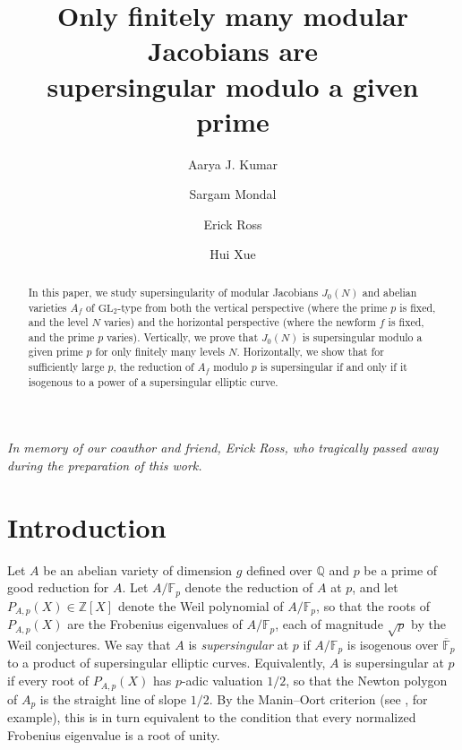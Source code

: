 \documentclass[11pt,letterpaper,reqno]{amsart}
\title{Only finitely many modular Jacobians are \\ supersingular modulo a given prime}
\author[A. J. Kumar]{Aarya J. Kumar}
\author[S. Mondal]{Sargam Mondal}
\author[E. Ross]{Erick Ross}
\author[H. Xue]{Hui Xue}
\theoremstyle{definition}
\numberwithin{equation}{section}
\numberwithin{figure}{section}
\numberwithin{table}{section}
\begin{document}
\begin{abstract}
In this paper, we study supersingularity of modular Jacobians $J_0(N)$ and abelian varieties $A_f$ of $\mathrm{GL}_{2}$-type from both the vertical perspective (where the prime $p$ is fixed, and the level $N$ varies) and the horizontal perspective (where the newform $f$ is fixed, and the prime $p$ varies). Vertically, we prove that $J_{0}(N)$ is supersingular modulo a given prime $p$ for only finitely many levels $N$. Horizontally, we show that for sufficiently large $p$, the reduction of $A_f$ modulo $p$ is supersingular if and only if it isogenous to a power of a supersingular elliptic curve.
\end{abstract}

\maketitle

\begin{center}
    \textit{In memory of our coauthor and friend, Erick Ross, who tragically passed away during the preparation of this work.}
\end{center}
\vspace{1ex}


\section{Introduction}\label{section:introduction}



Let $A$ be an abelian variety of dimension $g$ defined over $\mathbb{Q}$ and $p$ be a prime of good reduction for $A$. Let $A/\mathbb{F}_p$ denote the reduction of $A$ at $p$, and let $P_{A,p}(X) \in \mathbb{Z}[X]$ denote the Weil polynomial of $A/\mathbb{F}_p$, so that the roots of $P_{A,p}(X)$ are the Frobenius eigenvalues of $A/\mathbb{F}_p$, each of magnitude $\sqrt{p}$ by the Weil conjectures. We say that $A$ is \emph{supersingular} at $p$ if $A/\mathbb{F}_p$ is isogenous over $\overline{\mathbb{F}}_p$ to a product of supersingular elliptic curves. Equivalently, $A$ is supersingular at $p$ if every root of $P_{A,p}(X)$ has $p$-adic valuation $1/2$, so that the Newton polygon of $A_p$ is the straight line of slope $1/2$. By the Manin--Oort criterion (see \cite[Section 1]{Ayotte2016}, for example), this is in turn equivalent to the condition that every normalized Frobenius eigenvalue is a root of unity. 
\end{document}
